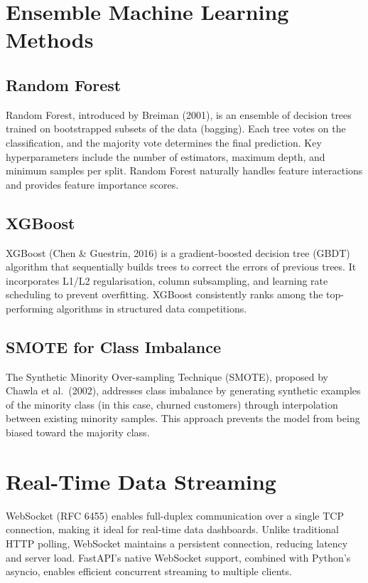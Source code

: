 \documentclass[12pt, a4paper]{report}
\begin{document}
\section{Ensemble Machine Learning Methods}

\subsection{Random Forest}

Random Forest, introduced by Breiman (2001), is an ensemble of decision trees trained on bootstrapped subsets of the data (bagging). Each tree votes on the classification, and the majority vote determines the final prediction. Key hyperparameters include the number of estimators, maximum depth, and minimum samples per split. Random Forest naturally handles feature interactions and provides feature importance scores.

\subsection{XGBoost}

XGBoost (Chen \& Guestrin, 2016) is a gradient-boosted decision tree (GBDT) algorithm that sequentially builds trees to correct the errors of previous trees. It incorporates L1/L2 regularisation, column subsampling, and learning rate scheduling to prevent overfitting. XGBoost consistently ranks among the top-performing algorithms in structured data competitions.

\subsection{SMOTE for Class Imbalance}

The Synthetic Minority Over-sampling Technique (SMOTE), proposed by Chawla et al.\ (2002), addresses class imbalance by generating synthetic examples of the minority class (in this case, churned customers) through interpolation between existing minority samples. This approach prevents the model from being biased toward the majority class.

\section{Real-Time Data Streaming}

WebSocket (RFC 6455) enables full-duplex communication over a single TCP connection, making it ideal for real-time data dashboards. Unlike traditional HTTP polling, WebSocket maintains a persistent connection, reducing latency and server load. FastAPI's native WebSocket support, combined with Python's asyncio, enables efficient concurrent streaming to multiple clients.
\end{document}
